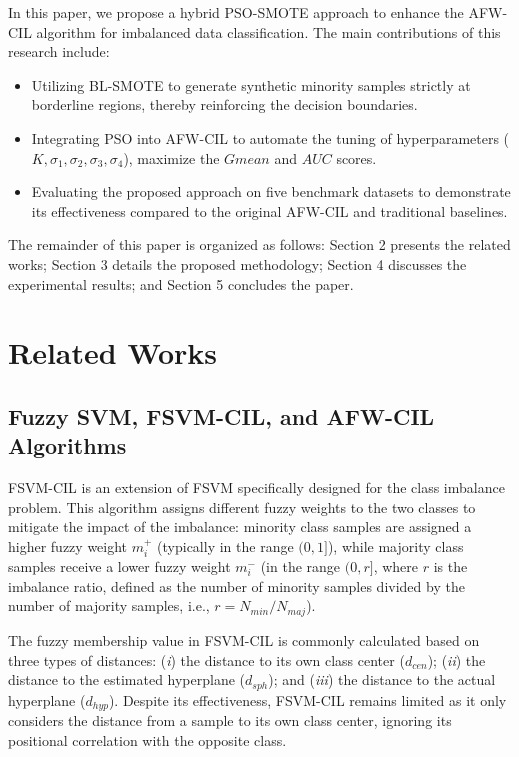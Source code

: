 \documentclass[pdflatex,sn-mathphys-num]{sn-jnl}%
\theoremstyle{thmstyleone}%
\theoremstyle{thmstyletwo}
\theoremstyle{thmstylethree}
\begin{document}
In this paper, we propose a hybrid PSO-SMOTE approach to enhance the AFW-CIL algorithm for imbalanced data classification. The main contributions of this research include:
\begin{itemize}
    \item Utilizing BL-SMOTE to generate synthetic minority samples strictly at borderline regions, thereby reinforcing the decision boundaries.
    \item Integrating PSO into AFW-CIL to automate the tuning of hyperparameters ($K, \sigma_1, \sigma_2, \sigma_3, \sigma_4$), maximize the $Gmean$ and $AUC$ scores.
    \item Evaluating the proposed approach on five benchmark datasets to demonstrate its effectiveness compared to the original AFW-CIL and traditional baselines.
\end{itemize}

The remainder of this paper is organized as follows: Section 2 presents the related works; Section 3 details the proposed methodology; Section 4 discusses the experimental results; and Section 5 concludes the paper.


\section{Related Works}\label{sec2}
\subsection{Fuzzy SVM, FSVM-CIL, and AFW-CIL Algorithms}\label{subsec2_1}
FSVM-CIL \cite{batuwita2010fsvm} is an extension of FSVM \cite{lin2002fuzzy} specifically designed for the class imbalance problem. This algorithm assigns different fuzzy weights to the two classes to mitigate the impact of the imbalance: minority class samples are assigned a higher fuzzy weight $m_i^+$ (typically in the range $(0,1]$), while majority class samples receive a lower fuzzy weight $m_i^-$ (in the range $(0,r]$, where $r$ is the imbalance ratio, defined as the number of minority samples divided by the number of majority samples, i.e., $r = N_{min}/N_{maj}$). 

The fuzzy membership value in FSVM-CIL is commonly calculated based on three types of distances: (\textit{i}) the distance to its own class center ($d_{cen}$); (\textit{ii}) the distance to the estimated hyperplane ($d_{sph}$); and (\textit{iii}) the distance to the actual hyperplane ($d_{hyp}$). Despite its effectiveness, FSVM-CIL remains limited as it only considers the distance from a sample to its own class center, ignoring its positional correlation with the opposite class.
\end{document}
